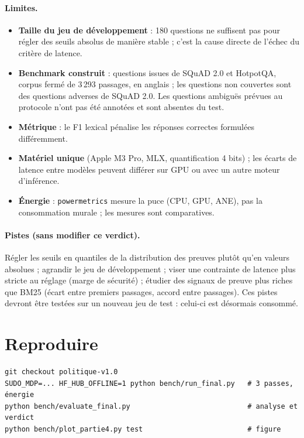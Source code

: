 \documentclass[11pt,a4paper]{article}
\begin{document}
\paragraph{Limites.}
\begin{itemize}
\item \textbf{Taille du jeu de développement} : 180 questions ne suffisent pas pour régler des seuils
absolus de manière stable ; c'est la cause directe de l'échec du critère de latence.
\item \textbf{Benchmark construit} : questions issues de SQuAD 2.0 et HotpotQA, corpus fermé de
3\,293 passages, en anglais ; les questions non couvertes sont des questions adverses de SQuAD 2.0.
Les questions ambiguës prévues au protocole n'ont pas été annotées et sont absentes du test.
\item \textbf{Métrique} : le F1 lexical pénalise les réponses correctes formulées différemment.
\item \textbf{Matériel unique} (Apple M3 Pro, MLX, quantification 4 bits) ; les écarts de latence entre
modèles peuvent différer sur GPU ou avec un autre moteur d'inférence.
\item \textbf{Énergie} : \texttt{powermetrics} mesure la puce (CPU, GPU, ANE), pas la consommation
murale ; les mesures sont comparatives.
\end{itemize}

\paragraph{Pistes (sans modifier ce verdict).} Régler les seuils en quantiles de la distribution des
preuves plutôt qu'en valeurs absolues ; agrandir le jeu de développement ; viser une contrainte de
latence plus stricte au réglage (marge de sécurité) ; étudier des signaux de preuve plus riches que BM25
(écart entre premiers passages, accord entre passages). Ces pistes devront être testées sur un nouveau
jeu de test : celui-ci est désormais consommé.

\appendix
\section{Reproduire}
\begin{small}
\begin{verbatim}
git checkout politique-v1.0
SUDO_MDP=... HF_HUB_OFFLINE=1 python bench/run_final.py   # 3 passes, énergie
python bench/evaluate_final.py                            # analyse et verdict
python bench/plot_partie4.py test                         # figure
\end{verbatim}
\end{small}
\end{document}
